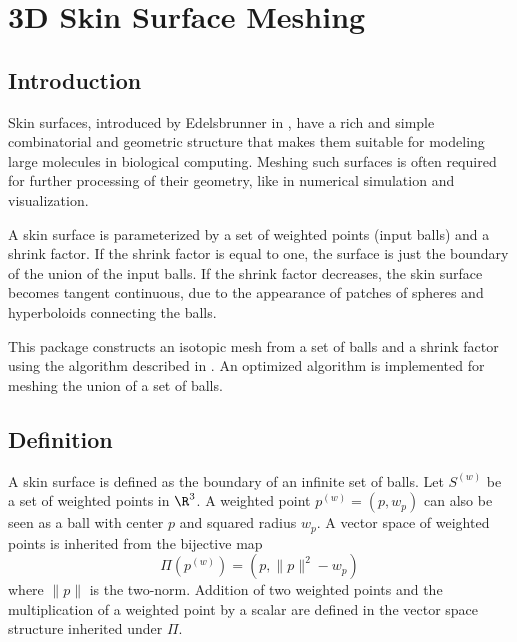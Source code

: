 
\chapter{3D Skin Surface Meshing}
\label{chapterSkinSurface}

\minitoc

\section{Introduction}
\label{sectionSkinSurfaceIntro}

Skin surfaces, introduced by Edelsbrunner in \cite{cgal:e-dssd-99},
have a rich and simple combinatorial and geometric structure that
makes them suitable for modeling large molecules in biological
computing.  Meshing such surfaces is often required for further
processing of their geometry, like in numerical simulation and
visualization.

A skin surface is parameterized by a set of weighted points (input
balls) and a shrink factor. If the shrink factor is equal to one, the
surface is just the boundary of the union of the input balls.  If the
shrink factor decreases, the skin surface becomes tangent continuous,
due to the appearance of patches of spheres and hyperboloids
connecting the balls.

This package constructs an isotopic mesh from a set of balls and a
shrink factor using the algorithm described in
\cite{cgal:kv-mssct-05}. An optimized algorithm is implemented for
meshing the union of a set of balls.

\section{Definition}
A skin surface is defined as the boundary of an infinite set of balls.
Let ${S}^{(w)}$ be a set of weighted points in $\R^3$. A weighted
point ${p}^{(w)}=(p,w_p)$ can also be seen as a ball with center $p$
and squared radius $w_p$. A vector space of weighted points is
inherited from the bijective map
\[\Pi({p}^{(w)}) = ({p, \|{p}\|^2-w_p})\]
where $\|{p}\|$ is the two-norm. Addition of two weighted points and
the multiplication of a weighted point by a scalar are defined in the
vector space structure inherited under $\Pi$.

